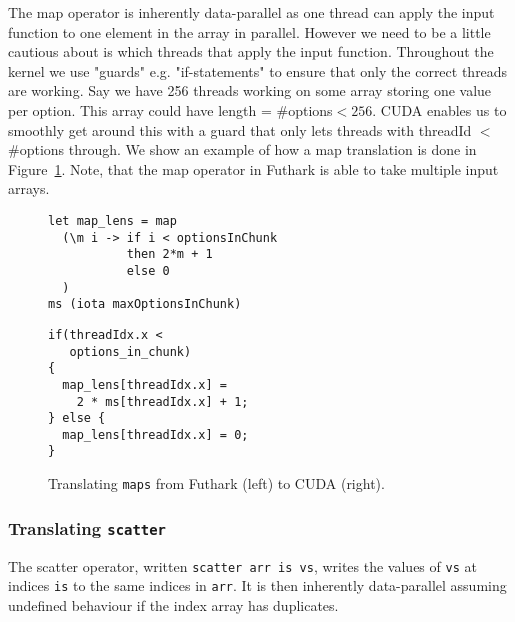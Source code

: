 The map operator is inherently data-parallel as one thread
can apply the input function to one element in the array in
parallel. However we need to be a little cautious 
about is which threads that apply the input function. 
Throughout the kernel we use "guards" e.g. "if-statements" 
to ensure that only the correct threads are working.
Say we have 256 threads working on some array storing one value
per option. This array could have length = \#options$< 256$. CUDA 
enables us to smoothly get around this with a guard that only
lets threads with threadId $<$ \#options through.
We show an example of how a map translation is done in
Figure~\ref{fig:trans_map}. Note, that the map operator 
in Futhark is able to take multiple input arrays.
%
\begin{figure}[bt]
\begin{center}
\begin{minipage}[t]{0.45\linewidth}
\vspace{0pt}
\begin{lstlisting}
let map_lens = map
  (\m i -> if i < optionsInChunk
           then 2*m + 1
           else 0
  )
ms (iota maxOptionsInChunk)
\end{lstlisting}
\end{minipage}
\begin{minipage}[t]{0.45\linewidth}
\vspace{0pt}
\begin{lstlisting}
if(threadIdx.x <
   options_in_chunk)
{
  map_lens[threadIdx.x] =
    2 * ms[threadIdx.x] + 1;
} else {
  map_lens[threadIdx.x] = 0;
}
\end{lstlisting}
\end{minipage}
\caption{Translating \texttt{maps} from Futhark (left) to
  CUDA (right).}
\label{fig:trans_map}
\end{center}
\end{figure}
%




\subsubsection{Translating \texttt{scatter}}

The scatter operator, written \lstinline{scatter arr is vs},
writes the values of \lstinline{vs} at indices
\lstinline{is} to the same indices in \lstinline{arr}. It is
then inherently data-parallel assuming undefined behaviour
if the index array has duplicates.

